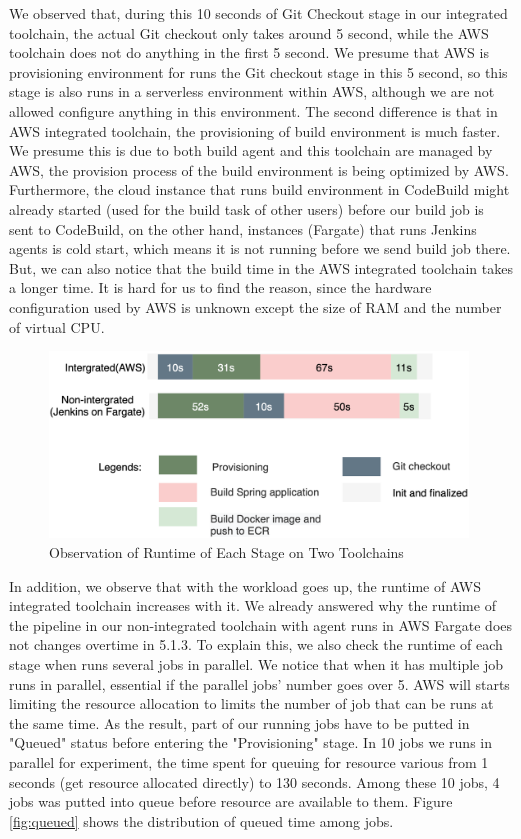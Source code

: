\par
 We observed that, during this 10 seconds of Git Checkout stage in our integrated toolchain, the actual Git checkout only takes around 5 second, while the AWS toolchain does not do anything in the first 5 second. We presume that AWS is provisioning environment for runs the Git checkout stage in this 5 second, so this stage is also runs in a serverless environment within AWS, although we are not allowed configure anything in this environment.
 The second difference is that in AWS integrated toolchain, the provisioning of build environment is much faster. We presume this is due to both build agent and this toolchain are managed by AWS, the provision process of the build environment is being optimized by AWS. Furthermore, the cloud instance that runs build environment in CodeBuild might already started (used for the build task of other users) before our build job is sent to CodeBuild, on the other hand, instances (Fargate) that runs Jenkins agents is cold start, which means it is not running before we send build job there.
 But, we can also notice that the build time in the AWS integrated toolchain takes a longer time. It is hard for us to find the reason, since the hardware configuration used by AWS is unknown except the size of RAM and the number of virtual CPU.
\begin{figure}[h]
    \centering
    \includegraphics[width=0.99\textwidth]{pics/stages.png}
    \caption{Observation of Runtime of Each Stage on Two Toolchains}
    \label{fig:stage_runtime}
    \end{figure}
 \par
 In addition, we observe that with the workload goes up, the runtime of AWS integrated toolchain increases with it. We already answered why the runtime of the pipeline in our non-integrated toolchain with agent runs in AWS Fargate does not changes overtime in 5.1.3. To explain this, we also check the runtime of each stage when runs several jobs in parallel. We notice that when it has multiple job runs in parallel, essential if the parallel jobs' number goes over 5. AWS will starts limiting the resource allocation to limits the number of job that can be runs at the same time. As the result, part of our running jobs have to be putted in "Queued" status before entering the "Provisioning" stage. In 10 jobs we runs in parallel for experiment, the time spent for queuing for resource various from 1 seconds (get resource allocated directly) to 130 seconds. Among these 10 jobs, 4 jobs was putted into queue before resource are available to them. Figure \ref{fig:queued} shows the distribution of queued time among jobs.
